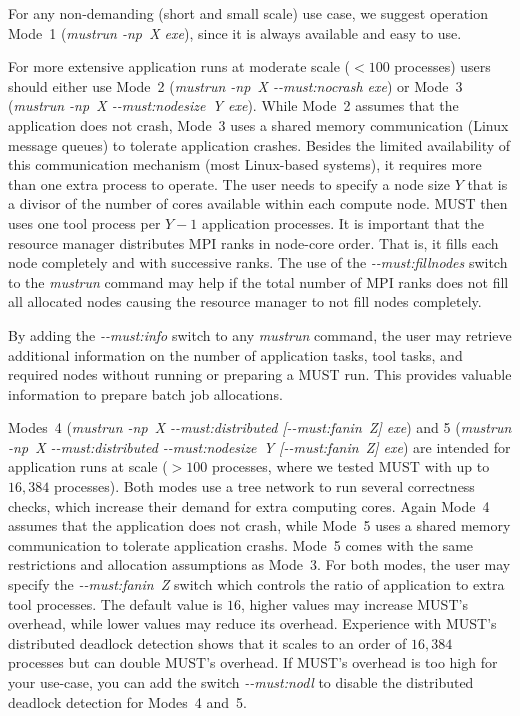 \documentclass[english]{scrartcl}
\begin{document}
For any non-demanding (short and small scale) use case, we suggest operation Mode~1 (\emph{mustrun \mbox{-np X} exe}), since it is always available and easy to use.

For more extensive application runs at moderate scale ($<100$ processes) users
should either use Mode~2 (\emph{mustrun \mbox{-np X} \mbox{-{}-must:nocrash} exe}) or Mode~3
(\emph{mustrun \mbox{-np X} \mbox{-{}-must:nodesize Y} exe}). While Mode~2 assumes that the
application does not crash, Mode~3 uses a shared memory communication (Linux
message queues) to tolerate application crashes. Besides the limited availability
of this communication mechanism (most Linux-based systems), it requires more
than one extra process to operate. The user needs to specify a node size $Y$ that
is a divisor of the number of cores available within each compute node. MUST
then uses one tool process per $Y-1$ application processes. It is important that
the resource manager distributes MPI ranks in node-core order. That is, it fills
each node completely and with successive ranks. The use of the
\emph{\mbox{-{}-must:fillnodes}} switch to the \emph{mustrun} command may help if the
total number of MPI ranks does not fill all allocated nodes causing the
resource manager to not fill nodes completely.

By adding the \emph{\mbox{-{}-must:info}} switch to any \emph{mustrun} command, the user
may retrieve additional information on the number of application tasks, tool
tasks, and required nodes without running or preparing a MUST run. This provides
valuable information to prepare batch job allocations.

Modes~4 (\emph{mustrun \mbox{-np X} \mbox{-{}-must:distributed} [\mbox{-{}-must:fanin Z}] exe}) and 5
(\emph{mustrun \mbox{-np X} \mbox{-{}-must:distributed} \mbox{-{}-must:nodesize Y} [\mbox{-{}-must:fanin Z}] exe})
are intended for application runs at scale ($>100$ processes, where we
tested MUST with up to $16{,}384$ processes). Both modes use a tree network to
run several correctness checks, which increase their demand for extra computing
cores. Again Mode~4 assumes that the application does not crash, while Mode~5
uses a shared memory communication to tolerate application crashs. Mode~5 comes
with the same restrictions and allocation assumptions as Mode~3. For
both modes, the user may specify the \emph{\mbox{-{}-must:fanin Z}} switch which
controls the ratio of application to extra tool processes. The default
value is $16$, higher values may increase MUST's overhead, while lower
values may reduce its overhead. Experience with MUST's
distributed deadlock detection shows that it
scales to an order of $16{,}384$ processes but can double
MUST's overhead. 
If MUST's overhead is too high for your use-case, you can add the switch
\emph{\mbox{-{}-must:nodl}} to disable the distributed deadlock detection for Modes~4 and~5. 
\end{document}
